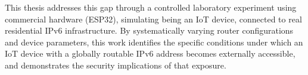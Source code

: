 This thesis addresses this gap through a controlled laboratory experiment using commercial hardware (ESP32), simulating being an IoT device, connected to real residential IPv6 infrastructure. By systematically varying router configurations and device parameters, this work identifies the specific conditions under which an IoT device with a globally routable IPv6 address becomes externally accessible, and demonstrates the security implications of that exposure.
